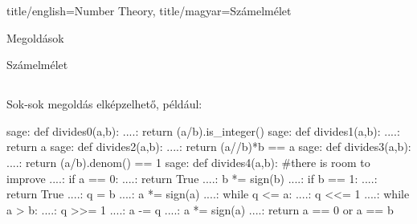 \documentclass{amsbook}
\begin{document}
\maketitle

\setcounter{part}{1}
\begin{Part*}{ title/english=Number Theory, title/magyar={Számelmélet}}
  
  

\end{Part*}

\begin{part}{Megoldások}

  \begin{section}{Számelmélet}

    \subsection{} Sok-sok megoldás elképzelhet\H o, például:
      \begin{sageexample}
          sage: def divides0(a,b):
          ....:     return (a/b).is_integer()
          sage: def divides1(a,b):
          ....:     return a %
          sage: def divides2(a,b):
          ....:     return (a//b)*b == a
          sage: def divides3(a,b):
          ....:     return (a/b).denom() == 1
          sage: def divides4(a,b): #there is room to improve
          ....:     if a == 0:
          ....:         return True
          ....:     b *= sign(b)
          ....:     if b == 1:
          ....:         return True
          ....:     q = b
          ....:     a *= sign(a)
          ....:     while q <= a:
          ....:         q <<= 1
          ....:     while a > b:
          ....:         q >>= 1
          ....:         a -= q  
          ....:         a *= sign(a)
          ....:     return a == 0 or a == b

          \end{sageexample}

      \end{section}

    \end{part}

    
\end{document}
